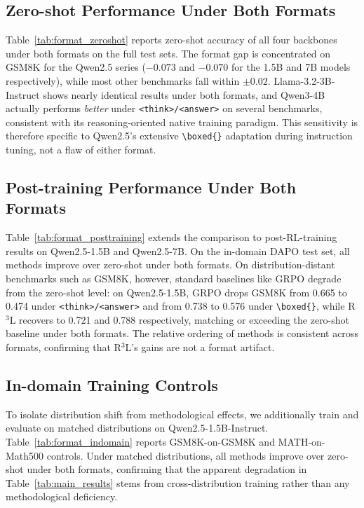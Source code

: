 \documentclass[11pt]{article}
\theoremstyle{definition}
\theoremstyle{remark}
\begin{document}
\subsection{Zero-shot Performance Under Both Formats}



Table~\ref{tab:format_zeroshot} reports zero-shot accuracy of all four backbones under both formats on the full test sets. The format gap is concentrated on GSM8K for the Qwen2.5 series ($-0.073$ and $-0.070$ for the 1.5B and 7B models respectively), while most other benchmarks fall within $\pm 0.02$. Llama-3.2-3B-Instruct shows nearly identical results under both formats, and Qwen3-4B actually performs \emph{better} under \texttt{<think>/<answer>} on several benchmarks, consistent with its reasoning-oriented native training paradigm. This sensitivity is therefore specific to Qwen2.5's extensive \texttt{\textbackslash boxed\{\}} adaptation during instruction tuning, not a flaw of either format.

\subsection{Post-training Performance Under Both Formats}



Table~\ref{tab:format_posttraining} extends the comparison to post-RL-training results on Qwen2.5-1.5B and Qwen2.5-7B. On the in-domain DAPO test set, all methods improve over zero-shot under both formats. On distribution-distant benchmarks such as GSM8K, however, standard baselines like GRPO degrade from the zero-shot level: on Qwen2.5-1.5B, GRPO drops GSM8K from 0.665 to 0.474 under \texttt{<think>/<answer>} and from 0.738 to 0.576 under \texttt{\textbackslash boxed\{\}}, while R$^3$L recovers to 0.721 and 0.788 respectively, matching or exceeding the zero-shot baseline under both formats. The relative ordering of methods is consistent across formats, confirming that R$^3$L's gains are not a format artifact.

\subsection{In-domain Training Controls}



To isolate distribution shift from methodological effects, we additionally train and evaluate on matched distributions on Qwen2.5-1.5B-Instruct. Table~\ref{tab:format_indomain} reports GSM8K-on-GSM8K and MATH-on-Math500 controls. Under matched distributions, all methods improve over zero-shot under both formats, confirming that the apparent degradation in Table~\ref{tab:main_results} stems from cross-distribution training rather than any methodological deficiency.
\end{document}
